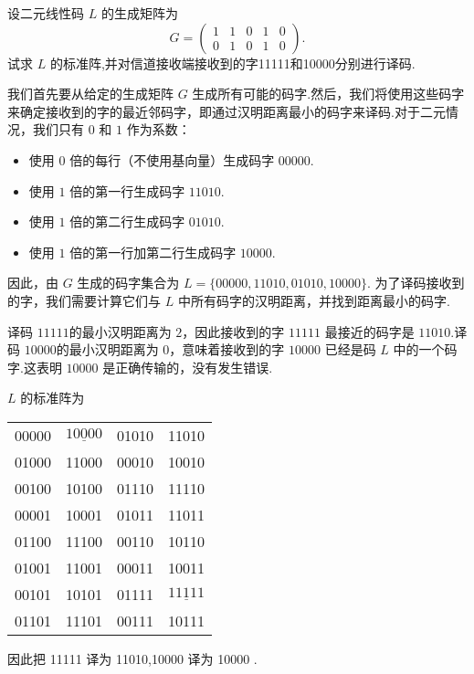 \begin{exercise}
 设二元线性码 $ L $ 的生成矩阵为
$$
G=\left(\begin{array}{lllll}
1 & 1 & 0 & 1 & 0 \\
0 & 1 & 0 & 1 & 0
\end{array}\right) .
$$
试求 $ L $ 的标准阵,并对信道接收端接收到的字11111和10000分别进行译码.
\end{exercise}
\begin{solution}
我们首先要从给定的生成矩阵 \(G\) 生成所有可能的码字.然后，我们将使用这些码字来确定接收到的字的最近邻码字，即通过汉明距离最小的码字来译码.对于二元情况，我们只有 \(0\) 和 \(1\) 作为系数：
\begin{itemize}
    \item 使用 \(0\) 倍的每行（不使用基向量）生成码字 \(00000\).
    \item 使用 \(1\) 倍的第一行生成码字 \(11010\).
    \item 使用 \(1\) 倍的第二行生成码字 \(01010\).
    \item 使用 \(1\) 倍的第一行加第二行生成码字 \( 10000\).
\end{itemize}
因此，由 \(G\) 生成的码字集合为 \(L = \{00000, 11010, 01010, 10000\}\).
为了译码接收到的字，我们需要计算它们与 \(L\) 中所有码字的汉明距离，并找到距离最小的码字.

 译码 \(11111\)的最小汉明距离为 \(2\)，因此接收到的字 \(11111\) 最接近的码字是 \(11010\).译码 \(10000\)的最小汉明距离为 \(0\)，意味着接收到的字 \(10000\) 已经是码 \(L\) 中的一个码字.这表明 \(10000\) 是正确传输的，没有发生错误.



    $ L $ 的标准阵为
    \begin{center}
\begin{tabular}{llll}
00000 & $ \underline{10000} $ & 01010 & 11010 \\
01000 & 11000 & 00010 & 10010 \\
00100 & 10100 & 01110 & 11110 \\
00001 & 10001 & 01011 & 11011 \\
01100 & 11100 & 00110 & 10110 \\
01001 & 11001 & 00011 & 10011 \\
00101 & 10101 & 01111 & $ \underline{11111} $ \\
01101 & 11101 & 00111 & 10111
\end{tabular}
\end{center}
因此把 11111 译为 11010,10000 译为 10000 .
\end{solution}

